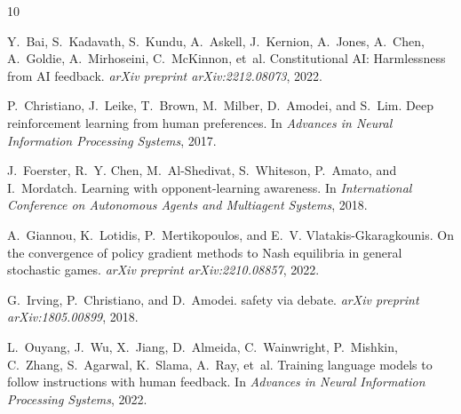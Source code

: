 \documentclass[11pt,a4paper]{article}
\begin{document}

\begin{thebibliography}{10}

Y.~Bai, S.~Kadavath, S.~Kundu, A.~Askell, J.~Kernion, A.~Jones, A.~Chen,
  A.~Goldie, A.~Mirhoseini, C.~McKinnon, et~al.
\newblock Constitutional {AI}: Harmlessness from {AI} feedback.
\newblock \emph{arXiv preprint arXiv:2212.08073}, 2022.

P.~Christiano, J.~Leike, T.~Brown, M.~Milber, D.~Amodei, and S.~Lim.
\newblock Deep reinforcement learning from human preferences.
\newblock In \emph{Advances in Neural Information Processing Systems}, 2017.

J.~Foerster, R.~Y. Chen, M.~Al-Shedivat, S.~Whiteson, P.~Amato, and
  I.~Mordatch.
\newblock Learning with opponent-learning awareness.
\newblock In \emph{International Conference on Autonomous Agents and
  Multiagent Systems}, 2018.

A.~Giannou, K.~Lotidis, P.~Mertikopoulos, and
  E.~V. Vlatakis-Gkaragkounis.
\newblock On the convergence of policy gradient methods to {N}ash equilibria in
  general stochastic games.
\newblock \emph{arXiv preprint arXiv:2210.08857}, 2022.

G.~Irving, P.~Christiano, and D.~Amodei.
 safety via debate.
\newblock \emph{arXiv preprint arXiv:1805.00899}, 2018.

L.~Ouyang, J.~Wu, X.~Jiang, D.~Almeida, C.~Wainwright, P.~Mishkin, C.~Zhang,
  S.~Agarwal, K.~Slama, A.~Ray, et~al.
\newblock Training language models to follow instructions with human feedback.
\newblock In \emph{Advances in Neural Information Processing Systems}, 2022.

\end{thebibliography}
\end{document}
